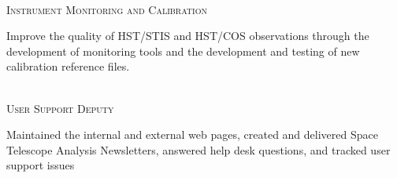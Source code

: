 \documentclass[10pt]{cv}
\begin{document}
\begin{llist}
\begin{minipage}[l]{0.7\textwidth}
\end{minipage}\vspace{0.15cm}
\\
\textsc{Instrument Monitoring and Calibration}\\
\begin{minipage}[l]{0.7\textwidth}\vspace{0.15cm}
Improve the quality of HST/STIS and HST/COS observations through the development of monitoring tools and the development and testing of new calibration reference files.\\
\end{minipage}\vspace{0.15cm}
\\
\textsc{User Support Deputy}\\
\begin{minipage}[l]{0.7\textwidth}\vspace{0.15cm}
Maintained the internal and external web pages, created and delivered Space Telescope Analysis Newsletters, answered help desk questions, and tracked user support issues\\
\end{minipage}\vspace{0.15cm}

\end{llist}
\end{document}

